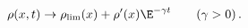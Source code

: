 \begin{equation}
\rho(x,t) \rightarrow \rho_\mathrm{lim}(x) + \rho'(x)\E^{-\gamma t}
\qquad (\gamma > 0)\, .
\label{eq2}
\end{equation}

